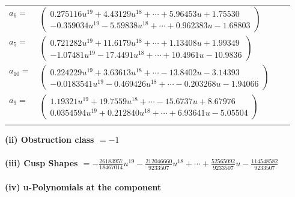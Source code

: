 \documentclass[1p]{elsarticle_modified}
\theoremstyle{definition}
\begin{document}
\begin{tabular}{m{7pt} m{180pt} m{7pt} m{180pt} }
\flushright $a_{6}=$&$\begin{pmatrix}0.275116 u^{19}+4.43129 u^{18}+\cdots+5.96453 u+1.75530\\-0.359034 u^{19}-5.59838 u^{18}+\cdots+0.962383 u-1.68803\end{pmatrix}$ \\
\flushright $a_{5}=$&$\begin{pmatrix}0.721282 u^{19}+11.6179 u^{18}+\cdots+1.13408 u+1.99349\\-1.07481 u^{19}-17.4491 u^{18}+\cdots+10.4961 u-10.9836\end{pmatrix}$ \\
\flushright $a_{10}=$&$\begin{pmatrix}0.224229 u^{19}+3.63613 u^{18}+\cdots-13.8402 u-3.14393\\-0.0183541 u^{19}-0.469426 u^{18}+\cdots-0.203268 u-1.94066\end{pmatrix}$ \\
\flushright $a_{9}=$&$\begin{pmatrix}1.19321 u^{19}+19.7559 u^{18}+\cdots-15.6737 u+8.67976\\0.0354594 u^{19}+0.212840 u^{18}+\cdots+6.93641 u-5.05504\end{pmatrix}$\\&\end{tabular}
\flushleft \textbf{(ii) Obstruction class $= -1$}\\~\\
\flushleft \textbf{(iii) Cusp Shapes $= -\frac{26183957}{18467014} u^{19}-\frac{212046660}{9233507} u^{18}+\cdots+\frac{52565092}{9233507} u-\frac{114548582}{9233507}$}\\~\\
\newpage\renewcommand{\arraystretch}{1}
\flushleft \textbf{(iv) u-Polynomials at the component}\newline \\
\end{document}

